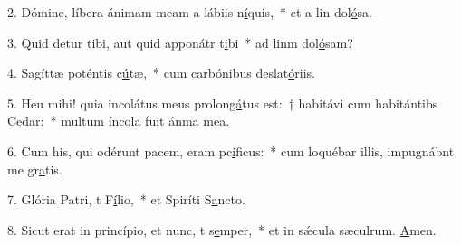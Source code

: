 2. Dómine, líbera ánimam meam a lábiis n\uline{í}quis,~* et a lin dol\uline{ó}sa.\par 
3. Quid detur tibi, aut quid apponátr t\uline{i}bi~* ad linm dol\uline{ó}sam?\par 
4. Sagíttæ poténtis c\uline{ú}tæ,~* cum carbónibus deslat\uline{ó}riis.\par 
5. Heu mihi! quia incolátus meus prolon\uline{gá}tus est:~† habitávi cum habitántibs C\uline{e}dar:~* multum íncola fuit ánma m\uline{e}a.\par 
6. Cum his, qui odérunt pacem, eram pc\uline{í}ficus:~* cum loquébar illis, impugnábnt me gr\uline{a}tis.\par 
7. Glória Patri, t F\uline{í}lio,~* et Spiríti S\uline{a}ncto.\par 
8. Sicut erat in princípio, et nunc, t s\uline{e}mper,~* et in sǽcula sæculrum. \uline{A}men.\par 
